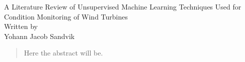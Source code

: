 \documentclass[11pt,english,a4paper,openright]{report}
\begin{document}
\setlength\parindent{0pt} %

\pagestyle{fancy}

\begin{titlepage}
    \centering
    
    {\LARGE A Literature Review of Unsupervised Machine Learning Techniques Used for Condition Monitoring of Wind Turbines} \\ [\baselineskip]
    
    {\Large Written by} \\ 
    {\Large Yohann Jacob Sandvik } \\

    \begin{abstract}
        Here the abstract will be.
    \end{abstract}

\end{titlepage}


\fancyhf{}

\tableofcontents
\newpage












% 

\printbibliography
\end{document}
